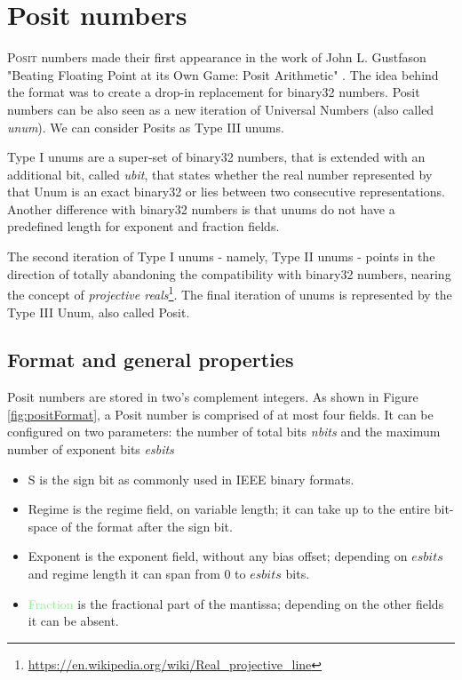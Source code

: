 \chapter{Posit numbers}\label{chap:posit_num}


\lettrine{P}{osit} numbers made their first appearance in the work of John L. Gustfason "Beating Floating Point at its Own Game: Posit Arithmetic" \cite{gustafson2017beating}. The idea behind the format was to create a drop-in replacement for binary32 numbers. Posit numbers can be also seen as a new iteration of Universal Numbers (also called \textit{unum}). We can consider Posits as Type III unums.


Type I unums are a super-set of binary32 numbers, that is extended with an additional bit, called \textit{ubit}, that states whether the real number represented by that Unum is an exact binary32 or lies between two consecutive representations. Another difference with binary32 numbers is that unums do not have a predefined length for exponent and fraction fields. 

The second iteration of Type I unums - namely, Type II unums - points in the direction of totally abandoning the compatibility with binary32 numbers, nearing the concept of \textit{projective reals}\footnote{\url{https://en.wikipedia.org/wiki/Real_projective_line}}. The final iteration of unums is represented by the Type III Unum, also called Posit.


\section{Format and general properties}

Posit numbers are stored in two's complement integers. As shown in Figure \ref{fig:positFormat}, a Posit number is comprised of at most four fields. It can be configured on two parameters: the number of total bits \textit{nbits} and the maximum number of exponent bits \textit{esbits}
\begin{itemize}
    \item  \textcolor{asparago}{S} is the sign bit as commonly used in IEEE binary formats.
    \item \textcolor{amber}{Regime} is the regime field, on variable length; it can take up to the entire bit-space of the format after the sign bit.
    \item \textcolor{lightred}{Exponent} is the exponent field, without any bias offset; depending on $esbits$ and regime length it can span from $0$ to $esbits$ bits.
    \item \textcolor{lightgreen}{Fraction} is the fractional part of the mantissa; depending on the other fields it can be absent.
\end{itemize}


